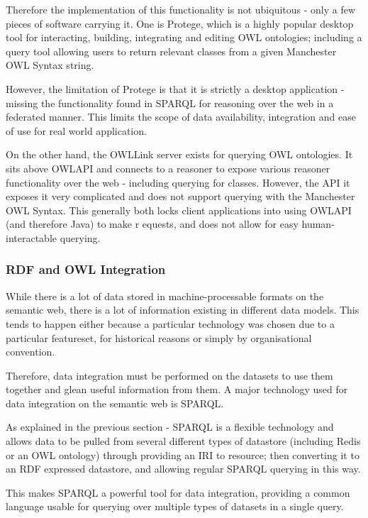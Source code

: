 \documentclass{article}
\begin{document}
Therefore the implementation of this functionality is not ubiquitous - only a
few pieces of software carrying it. One is Protege, which is a highly popular
desktop tool for interacting, building, integrating and editing OWL ontologies;
including a query tool allowing users to return relevant classes from a given
Manchester OWL Syntax string. 

However, the limitation of Protege is that it is strictly a desktop application
- missing the functionality found in SPARQL for reasoning over the web in a
federated manner. This limits the scope of data availability, integration and
ease of use for real world application. 

On the other hand, the OWLLink server exists for querying OWL ontologies. It
sits above OWLAPI and connects to a reasoner to expose various reasoner
functionality over the web - including querying for classes. However, the API it
exposes it very complicated and does not support querying with the Manchester
OWL Syntax. This generally
both locks client applications into using OWLAPI (and therefore Java) to make r
equests, and does not allow for easy human-interactable querying. 

\subsubsection{RDF and OWL Integration}

While there is a lot of data stored in machine-processable formats on the semantic web, 
there is a lot of information existing in different data models. This 
tends to happen either because a particular technology was chosen due to 
a particular featureset, for historical reasons or simply by organisational convention.

Therefore, data integration must be performed on the datasets to use them
together and glean useful information from them. A major technology used for 
data integration on the semantic web is SPARQL.

As explained in the previous section - SPARQL is a flexible technology and allows 
data to be pulled from several different types of datastore (including Redis or an 
OWL ontology) through providing an IRI to resource; then converting it to an RDF 
expressed datastore, and allowing regular SPARQL querying in this way. 

This makes SPARQL a powerful tool for data integration, providing a common
language usable for querying over multiple types of datasets in a single query.
\end{document}
